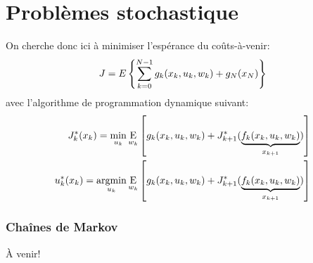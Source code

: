 \chapter{Problèmes stochastique}


On cherche donc ici à minimiser l'espérance du coûts-à-venir:
\begin{align}
    J = \large{E} \left\{ \sum_{k=0}^{N-1} g_k(x_k, u_k , w_k) + g_N( x_N ) \right\}
\end{align}
avec l'algorithme de programmation dynamique suivant:
\begin{align}
J^*_k(x_k) = 
\operatornamewithlimits{min}\limits_{u_k}
\operatornamewithlimits{E}\limits_{w_k}
\left[
g_k(x_k , u_k , w_k ) + J^*_{k+1}( 
\underbrace{
f_k(x_k , u_k , w_k ) 
}_{x_{k+1}}
)
\right] \\
u^*_k(x_k) = 
\operatornamewithlimits{argmin}\limits_{u_k}
\operatornamewithlimits{E}\limits_{w_k}
\left[
g_k(x_k , u_k , w_k) + J^*_{k+1}( 
\underbrace{
f_k(x_k , u_k , w_k) 
}_{x_{k+1}}
)
\right] 
\end{align} 


\subsection{Chaînes de Markov}


À venir!